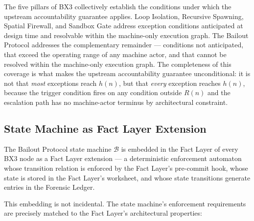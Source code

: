 The five pillars of BX3 collectively establish the conditions under which the upstream accountability guarantee applies. Loop Isolation, Recursive Spawning, Spatial Firewall, and Sandbox Gate address exception conditions anticipated at design time and resolvable within the machine-only execution graph. The Bailout Protocol addresses the complementary remainder --- conditions not anticipated, that exceed the operating range of any machine actor, and that cannot be resolved within the machine-only execution graph. The completeness of this coverage is what makes the upstream accountability guarantee unconditional: it is not that \emph{most} exceptions reach $h(n)$, but that \emph{every} exception reaches $h(n)$, because the trigger condition fires on any condition outside $R(n)$ and the escalation path has no machine-actor terminus by architectural constraint.

\subsection{State Machine as Fact Layer Extension}\label{sec:state-machine-fact-layer}

The Bailout Protocol state machine $\mathcal{B}$ is embedded in the Fact Layer of every BX3 node as a Fact Layer extension --- a deterministic enforcement automaton whose transition relation is enforced by the Fact Layer's pre-commit hook, whose state is stored in the Fact Layer's worksheet, and whose state transitions generate entries in the Forensic Ledger.

This embedding is not incidental. The state machine's enforcement requirements are precisely matched to the Fact Layer's architectural properties:

